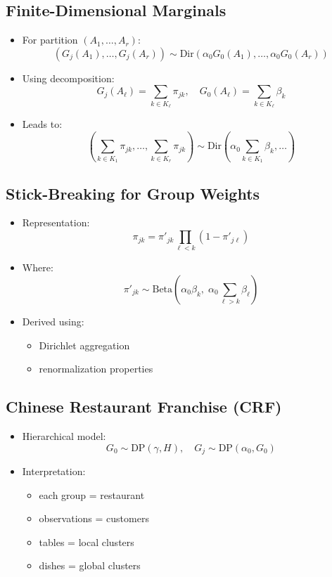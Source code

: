 \documentclass[12pt,oneside]{book}
\numberwithin{equation}{section}
\theoremstyle{definition}
\theoremstyle{plain}
\theoremstyle{remark}
\begin{document}
\subsection*{Finite-Dimensional Marginals}

\begin{itemize}
\item For partition $(A_1,\dots,A_r)$:
\[
(G_j(A_1),\dots,G_j(A_r)) \sim \text{Dir}(\alpha_0 G_0(A_1),\dots,\alpha_0 G_0(A_r))
\]

\item Using decomposition:
\[
G_j(A_\ell) = \sum_{k \in K_\ell} \pi_{jk}, \quad G_0(A_\ell) = \sum_{k \in K_\ell} \beta_k
\]

\item Leads to:
\[
\left(\sum_{k \in K_1} \pi_{jk}, \dots, \sum_{k \in K_r} \pi_{jk} \right)
\sim \text{Dir}\left(\alpha_0 \sum_{k \in K_1} \beta_k, \dots \right)
\]
\end{itemize}

\subsection*{Stick-Breaking for Group Weights}

\begin{itemize}
\item Representation:
\[
\pi_{jk} = \pi'_{jk} \prod_{\ell<k} (1 - \pi'_{j\ell})
\]

\item Where:
\[
\pi'_{jk} \sim \text{Beta}\left(\alpha_0 \beta_k,\; \alpha_0 \sum_{\ell>k} \beta_\ell \right)
\]

\item Derived using:
\begin{itemize}
\item Dirichlet aggregation
\item renormalization properties
\end{itemize}
\end{itemize}

\subsection{Chinese Restaurant Franchise (CRF)}

\begin{itemize}
\item Hierarchical model:
\[
G_0 \sim \text{DP}(\gamma, H), \quad G_j \sim \text{DP}(\alpha_0, G_0)
\]

\item Interpretation:
\begin{itemize}
\item each group = restaurant
\item observations = customers
\item tables = local clusters
\item dishes = global clusters
\end{itemize}
\end{itemize}
\end{document}

